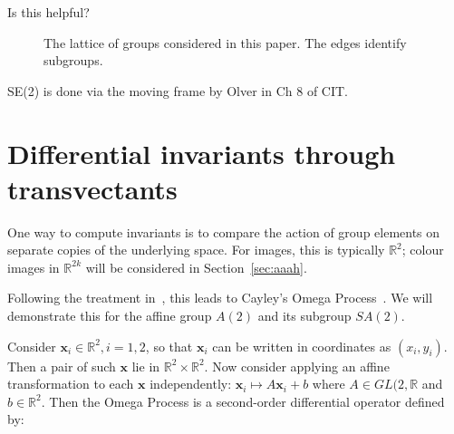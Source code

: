 \documentclass[review,onefignum,onetabnum]{siamonline190516}
\begin{document}
Is this helpful? 
\begin{figure}
\begin{center}
\end{center}
\caption{The lattice of groups considered in this paper. The edges identify subgroups.}
\end{figure}



SE(2) is done via the moving frame by Olver in Ch 8 of CIT.

\section{Differential invariants through transvectants}

One way to compute invariants is to compare the action of group elements on separate copies of the underlying space. For images, this is typically $\mathbb{R}^2$; colour images in $\mathbb{R}^{2k}$ will be considered in Section~\ref{sec:aaah}. 

Following the treatment in~\cite{OlverCIT}, this leads to Cayley's Omega Process~\cite{Cayley}. We will demonstrate this for the affine group $A(2)$ and its subgroup $SA(2)$. 


Consider $\mathbf{x}_i \in \mathbb{R}^2, i=1,2$, so that $\mathbf{x}_i$ can be written in coordinates as $(x_i, y_i)$. Then a pair of such $\mathbf{x}$ lie in $\mathbb{R}^2 \times \mathbb{R}^2$.  Now consider applying an affine transformation to each $\mathbf{x}$ independently: $\mathbf{x}_i \mapsto A \mathbf{x}_i + b$ where $A \in GL(2,\mathbb{R}$ and $b \in \mathbb{R}^2$. Then the Omega Process is a second-order differential operator defined by:
\end{document}
